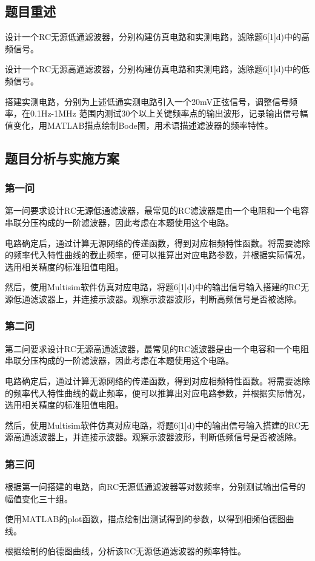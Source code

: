 \documentclass[./测控三级项目.tex]{subfiles} %
\begin{document}
	\subsection{题目重述}
		\begin{compactenum}
			\item 设计一个RC无源低通滤波器，分别构建仿真电路和实测电路，滤除题6[1]d)中的高频信号。
			\item 设计一个RC无源高通滤波器，分别构建仿真电路和实测电路，滤除题6[1]d)中的低频信号。
			\item 搭建实测电路，分别为上述低通实测电路引入一个20mV正弦信号，调整信号频率，在0.1Hz-1MHz 范围内测试30个以上关键频率点的输出波形，记录输出信号幅值变化，用MATLAB描点绘制Bode图，用术语描述滤波器的频率特性。
		\end{compactenum}
	\subsection{题目分析与实施方案}
		\subsubsection{第一问}
			第一问要求设计RC无源低通滤波器，最常见的RC滤波器是由一个电阻和一个电容串联分压构成的一阶滤波器，因此考虑在本题使用这个电路。\par
			电路确定后，通过计算无源网络的传递函数，得到对应相频特性函数。将需要滤除的频率代入特性曲线的截止频率，便可以推算出对应电路参数，并根据实际情况，选用相关精度的标准阻值电阻。\par
			然后，使用Multisim软件仿真对应电路，将题6[1]d)中的输出信号输入搭建的RC无源低通滤波器上，并连接示波器。观察示波器波形，判断高频信号是否被滤除。
		\subsubsection{第二问}
			第二问要求设计RC无源高通滤波器，最常见的RC滤波器是由一个电容和一个电阻串联分压构成的一阶滤波器，因此考虑在本题使用这个电路。\par
			电路确定后，通过计算无源网络的传递函数，得到对应相频特性函数。将需要滤除的频率代入特性曲线的截止频率，便可以推算出对应电路参数，并根据实际情况，选用相关精度的标准阻值电阻。\par
			然后，使用Multisim软件仿真对应电路，将题6[1]d)中的输出信号输入搭建的RC无源高通滤波器上，并连接示波器。观察示波器波形，判断低频信号是否被滤除。
		\subsubsection{第三问}
			根据第一问搭建的电路，向RC无源低通滤波器等对数频率，分别测试输出信号的幅值变化三十组。\par
			使用MATLAB的plot函数，描点绘制出测试得到的参数，以得到相频伯德图曲线。\par
			根据绘制的伯德图曲线，分析该RC无源低通滤波器的频率特性。
	
\end{document}
